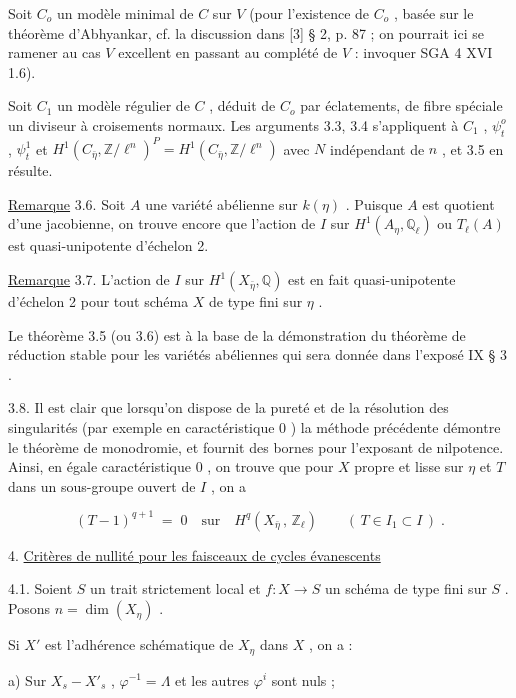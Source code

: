 Soit  $C_o$  un modèle minimal de  $C$  sur  $V$  (pour l'existence de  $C_o$ , basée sur le théorème d'Abhyankar, cf. la discussion dans  [3] § 2, p. 87 ; on pourrait ici se ramener au cas  $V$  excellent en passant au complété de  $V$ : invoquer SGA 4 XVI 1.6).

Soit  $C_1$  un modèle régulier de  $C$ , déduit de  $C_o$  par éclatements, de fibre spéciale un diviseur à croisements  normaux. Les arguments 3.3, 3.4 s'appliquent à  $C_1$ , $\psi_t^o$ , $\psi_t^1$  et  $H^1(C_{\bar\eta},\mathbb{Z}/\ell^n)^P = H^1(C_{\bar\eta},\mathbb{Z}/\ell^n)$  avec  $N$  indépendant de  $n$ , et 3.5 en résulte.

\underline{Remarque} 3.6.    Soit  $A$  une variété abélienne sur  $k(\eta)$ . Puisque  $A$  est quotient d'une jacobienne, on trouve encore que l'action de  $I$  sur  $H^1(A_\eta,\mathbb{Q}_\ell)$  ou  $T_\ell(A)$  est quasi-unipotente d'échelon 2.

\underline{Remarque} 3.7.   L'action de  $I$  sur  $H^1(X_{\bar\eta},\mathbb{Q})$  est en fait quasi-unipotente d'échelon 2 pour tout schéma  $X$  de type fini sur  $\eta$ .

Le théorème 3.5 (ou 3.6) est à la base de la démonstration du théorème de réduction stable pour les variétés abéliennes qui sera donnée dans l'exposé IX § 3 .

3.8.   Il est clair que lorsqu'on dispose de la pureté et de la résolution des singularités (par exemple en caractéristique 0 ) la méthode précédente démontre le théorème de monodromie, et fournit des bornes pour l'exposant de nilpotence. Ainsi, en égale caractéristique 0 , on trouve que pour  $X$  propre et lisse sur  $\eta$  et  $T$  dans un sous-groupe ouvert de  $I$ , on a

\begin{equation*}
(T - 1)^{q+1} \;=\; 0 \quad \text{sur} \quad H^q(X_{\bar\eta}\,,\, \mathbb{Z}_\ell) \qquad ( \, T \in I_1 \subset I \, ) \; .
\end{equation*}

4. \underline{Critères de nullité pour les faisceaux de cycles évanescents}

4.1.  Soient  $S$  un trait strictement local et  $f : X \longrightarrow S$  un schéma de type fini sur  $S$ . Posons  $n = \dim(X_\eta)$ .

Si  $X'$  est l'adhérence schématique de  $X_\eta$ dans  $X$ , on a :

a) Sur  $X_s - X'_s$ ,  $\varphi^{-1} = \Lambda$  et les autres  $\varphi^i$  sont nuls ;



